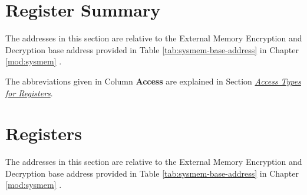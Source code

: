 \documentclass[main\_\_EN.tex]{subfiles}
\begin{document}

\clearpage
\section{Register Summary}
\label{sec:extmemencr-reg-summ}
\hypertarget{extmemencr-reg-summ}{}

The addresses in this section are relative to the External Memory Encryption and Decryption base address provided in Table \ref{tab:sysmem-base-address} in Chapter \ref{mod:sysmem} \textit{}.

The abbreviations given in Column \textbf{Access} are explained in Section \hyperref[glossary-access-types]{\textit{Access Types for Registers}}.





\clearpage
\section{Registers}

The addresses in this section are relative to the External Memory Encryption and Decryption base address provided in Table \ref{tab:sysmem-base-address} in Chapter \ref{mod:sysmem} \textit{}.


\end{document}
